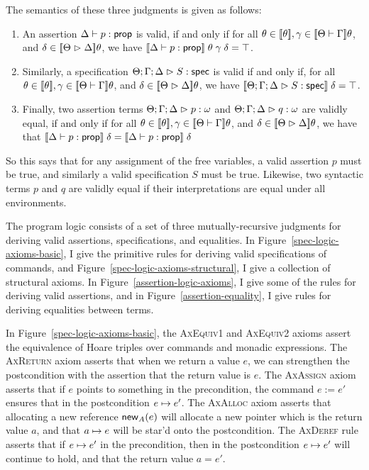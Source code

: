 \noindent The semantics of these three judgments is given as follows:
\begin{enumerate}
\item An assertion ${\Delta} \vdash {p} : {\mathsf{prop}}$ is valid, if and only
  if for all $\theta \in [\![{\theta}]\!], \gamma \in
  [\![{{\Theta} \vdash {\Gamma}}]\!]\theta$, and $\delta \in
  [\![{{\Theta} \vartriangleright {\Delta}}]\!]\theta$, we have
  $[\![{{\Delta} \vdash {p} : {\mathsf{prop}}}]\!]\;\theta\;\gamma\;\delta = \top$.

\item Similarly, a specification ${\Theta; \Gamma; \Delta} \vartriangleright {S} : \mathsf{spec}$ is valid if and only
if, for all $\theta \in [\![{\theta}]\!], \gamma \in
  [\![{{\Theta} \vdash {\Gamma}}]\!]\theta$, and $\delta \in
  [\![{{\Theta} \vartriangleright {\Delta}}]\!]\theta$, we have
$[\![{{\Theta; \Gamma; \Delta} \vartriangleright {S} : \mathsf{spec}}]\!]\;\delta = \top$.

\item Finally, two assertion terms ${\Theta; \Gamma; \Delta} \vartriangleright {p} : {\omega}$ and
${\Theta; \Gamma; \Delta} \vartriangleright {q} : {\omega}$ are validly equal, if and only if for all 
$\theta \in [\![{\theta}]\!], \gamma \in
  [\![{{\Theta} \vdash {\Gamma}}]\!]\theta$, and $\delta \in
  [\![{{\Theta} \vartriangleright {\Delta}}]\!]\theta$, we have that
$[\![{{\Delta} \vdash {p} : {\mathsf{prop}}}]\!]\;\delta = [\![{{\Delta} \vdash {p} : {\mathsf{prop}}}]\!]\;\delta$
\end{enumerate}

So this says that for any assignment of the free variables, a valid
assertion $p$ must be true, and similarly a valid specification $S$
must be true. Likewise, two syntactic terms $p$ and $q$ are validly
equal if their interpretations are equal under all environments. 

The program logic consists of a set of three mutually-recursive
judgments for deriving valid assertions, specifications, and
equalities. In Figure~\ref{spec-logic-axioms-basic}, I give the
primitive rules for deriving valid specifications of commands, and
Figure~\ref{spec-logic-axioms-structural}, I give a collection of
structural axioms.  In Figure~\ref{assertion-logic-axioms}, I give
some of the rules for deriving valid assertions, and in
Figure~\ref{assertion-equality}, I give rules for deriving equalities
between terms.

In Figure~\ref{spec-logic-axioms-basic}, the \textsc{AxEquiv1} and
\textsc{AxEquiv2} axioms assert the equivalence of Hoare triples over
commands and monadic expressions.  The \textsc{AxReturn} axiom asserts
that when we return a value $e$, we can strengthen the postcondition
with the assertion that the return value is $e$. The \textsc{AxAssign}
axiom asserts that if $e$ points to something in the precondition, the
command $e := e'$ ensures that in the postcondition $e \mapsto
e'$. The \textsc{AxAlloc} axiom asserts that allocating a new
reference $\mathsf{new}_{A}(e)$ will allocate a new pointer which is the
return value $a$, and that $a \mapsto e$ will be star'd onto the
postcondition. The \textsc{AxDeref} rule asserts that if $e \mapsto
e'$ in the precondition, then in the postcondition $e \mapsto e'$
will continue to hold, and that the return value $a = e'$.

